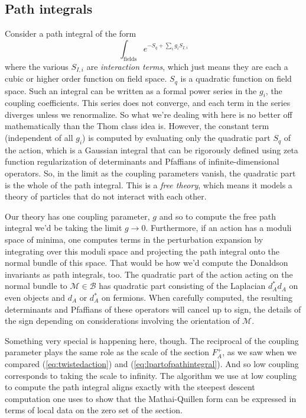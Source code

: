 \documentclass[twoside]{amsart}
\renewcommand{\eqref}[1]{(\ref{eq:#1})}
\newcommand{\enm}[1]{\ensuremath{#1}}
\newcommand{\bb}{\enm{\mathcal{B}}}
\newcommand{\mm}{\enm{\mathcal{M}}}
\begin{document}
\subsection{Path integrals}
Consider a path integral of the form
\[\int_{\mathrm{fields}}e^{-S_{q}+\sum_{i}g_{i}S_{I,i}} \] where the
various \( S_{I, i} \) are \emph{interaction terms}, which just means
they are each a cubic or higher order function on field space.  \(
S_{q} \) is a quadratic function on field space.  Such an integral can
be written as a formal power series in the \( g_{i} \), the coupling
coefficients.  This series does not converge, and each term in the
series diverges unless we renormalize.  So what we're dealing with
here is no better off mathematically than the Thom class idea is.
However, the constant term (independent of all \( g_{i} \)) is
computed by evaluating only the quadratic part \( S_{q} \) of the
action, which is a Gaussian integral that can be rigorously defined
using zeta function regularization of determinants and Pfaffians of
infinite-dimensional operators.  So,
in the limit as the coupling parameters vanish, the quadratic part is
the whole of the path integral.  This is a \emph{free theory}, which
means it models a theory of particles that do not interact with each
other.

Our theory has one coupling parameter, \( g \) and so to compute the
free path integral we'd be taking the limit \( g\to 0 \).
Furthermore, if an action has a moduli space of minima, one computes
terms in the perturbation expansion by integrating over this moduli
space and projecting the path integral onto the normal bundle of this
space.  That would be how we'd compute the Donaldson invariants as
path integrals, too.  The quadratic part of the action acting on the
normal bundle to \( \mm\in\bb \) has quadratic part consisting of the
Laplacian \( d_{A}^{*}d_{A} \) on even objects and \( d_{A} \) or \(
d_{A}^{*} \) on fermions.  When carefully computed, the resulting
determinants and Pfaffians of these operators will cancel up to sign,
the details of the sign depending on considerations involving the
orientation of \mm.

Something very special is happening here, though.  The reciprocal of
the coupling parameter plays the same role as the scale of the section
\( F_{A}^{+} \), as we saw when we compared \eqref{twistedaction} and
\eqref{lpartofpathintegral}.  And so low coupling corresponds to
taking the scale to infinity.  The algorithm we use at low coupling to
compute the path integral aligns exactly with the steepest descent
computation one uses to show that the Mathai-Quillen form can be
expressed in terms of local data on the zero set of the section.
\end{document}
